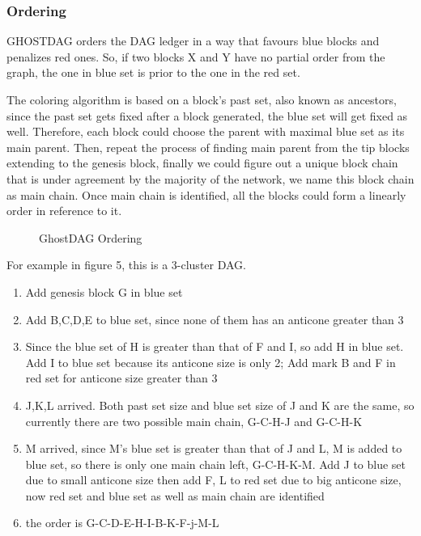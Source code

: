 \documentclass[a4paper,11pt]{article}
\begin{document}
\subsubsection{Ordering}

GHOSTDAG orders the DAG ledger in a way that favours blue blocks and penalizes
red ones. So, if two blocks X and Y have no partial order from the graph, the one in blue set is prior to the one in the red set.

The coloring algorithm is based on a block's past set, also known as ancestors, since the past set gets fixed after a block generated, the blue set will get fixed as well. Therefore, each block could choose the parent with maximal blue set as its main parent. Then, repeat the process of finding main parent from the tip blocks extending to the genesis block, finally we could figure out a unique block chain that is under agreement by the majority of the network, we name this block chain as main chain. Once main chain is identified, all the blocks could form a linearly order in reference to it. 


\begin{figure}[ht]
	\centerline{%
	}
\caption{GhostDAG Ordering}
\end{figure}

For example in figure 5, this is a 3-cluster DAG. 

\begin{enumerate}
	\item Add genesis block G in blue set
	\item Add B,C,D,E to blue set, since none of them has an anticone greater than 3
	\item Since the blue set of H is greater than that of F and I, so add H in blue set. Add I to blue set because its anticone size is only 2; Add mark B and F in red set for anticone size greater than 3
	\item J,K,L arrived. Both past set size and blue set size of J and K are the same, so currently there are two possible main chain, G-C-H-J and G-C-H-K 
	\item M arrived, since M's blue set is greater than that of J and L, M is added to blue set, so there is only one main chain left, G-C-H-K-M. Add J to blue set due to small anticone size then add F, L to red set due to big anticone size, now red set and blue set as well as main chain are identified
	\item the order is G-C-D-E-H-I-B-K-F-j-M-L
\end{enumerate}
\end{document}
